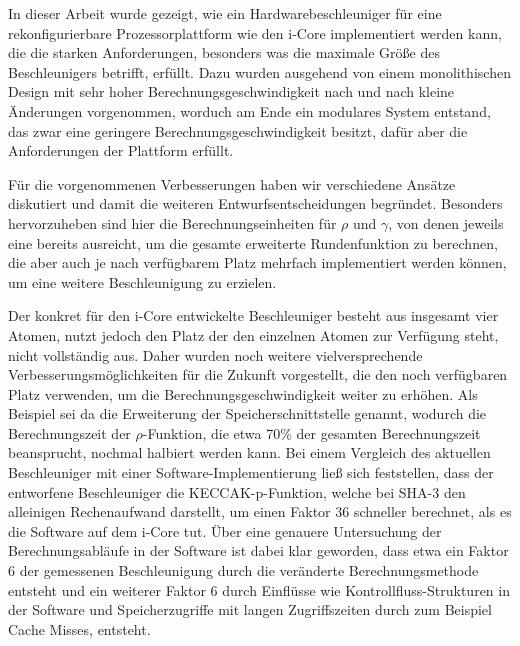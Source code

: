 

In dieser Arbeit wurde gezeigt, wie ein Hardwarebeschleuniger für eine rekonfigurierbare Prozessorplattform
wie den i-Core implementiert werden kann, die die starken Anforderungen, besonders was die maximale Größe des Beschleunigers betrifft, erfüllt.
Dazu wurden ausgehend von einem monolithischen Design mit sehr hoher Berechnungsgeschwindigkeit
nach und nach kleine Änderungen vorgenommen, worduch am Ende ein modulares System entstand, das zwar eine geringere
Berechnungsgeschwindigkeit besitzt, dafür aber die Anforderungen der Plattform erfüllt.



Für die vorgenommenen Verbesserungen haben wir verschiedene Ansätze diskutiert und damit die weiteren
Entwurfsentscheidungen begründet. Besonders hervorzuheben sind hier die Berechnungseinheiten für $\rho$ und $\gamma$,
von denen jeweils eine bereits ausreicht, um die gesamte erweiterte Rundenfunktion zu berechnen, die aber auch
je nach verfügbarem Platz mehrfach implementiert werden können, um eine weitere Beschleunigung zu erzielen.


Der konkret für den i-Core entwickelte Beschleuniger besteht aus insgesamt vier Atomen,
nutzt jedoch den Platz der den einzelnen Atomen zur Verfügung steht, nicht vollständig aus.
Daher wurden noch weitere vielversprechende Verbesserungsmöglichkeiten für die Zukunft vorgestellt,
die den noch verfügbaren Platz verwenden, um die Berechnungsgeschwindigkeit weiter zu erhöhen.
Als Beispiel sei da die Erweiterung der Speicherschnittstelle genannt, wodurch die Berechnungszeit der
$\rho$-Funktion, die etwa 70\% der gesamten Berechnungszeit beansprucht, nochmal halbiert werden kann.
Bei einem Vergleich des aktuellen Beschleuniger mit einer Software-Implementierung ließ sich feststellen,
dass der entworfene Beschleuniger die KECCAK-p-Funktion, welche bei SHA-3 den alleinigen Rechenaufwand darstellt,
um einen Faktor 36 schneller berechnet, als es die Software auf dem i-Core tut. Über eine genauere Untersuchung
der Berechnungsabläufe in der Software ist dabei klar geworden, dass etwa ein Faktor 6 der gemessenen Beschleunigung
durch die veränderte Berechnungsmethode entsteht und ein weiterer Faktor 6 durch Einflüsse wie Kontrollfluss-Strukturen
in der Software und Speicherzugriffe mit langen Zugriffszeiten durch zum Beispiel Cache Misses, entsteht.